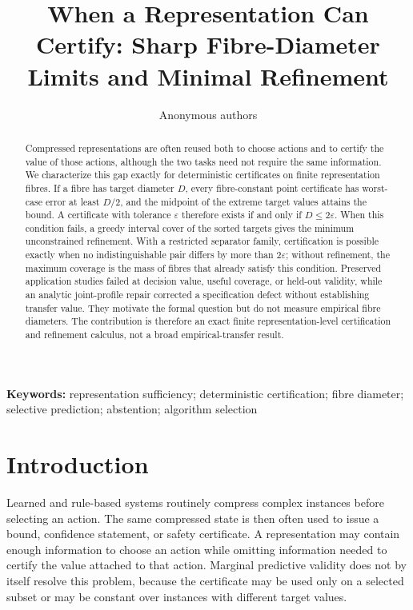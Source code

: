\documentclass[10pt]{article}
\title{When a Representation Can Certify: Sharp Fibre-Diameter Limits and Minimal Refinement}
\author{Anonymous authors}
\newcommand{\1}{\mathbf{1}}
\begin{document}
\raggedbottom
\maketitle

\begin{abstract}
Compressed representations are often reused both to choose actions and to certify the value of those actions, although the two tasks need not require the same information. We characterize this gap exactly for deterministic certificates on finite representation fibres. If a fibre has target diameter $D$, every fibre-constant point certificate has worst-case error at least $D/2$, and the midpoint of the extreme target values attains the bound. A certificate with tolerance $\varepsilon$ therefore exists if and only if $D\leq 2\varepsilon$. When this condition fails, a greedy interval cover of the sorted targets gives the minimum unconstrained refinement. With a restricted separator family, certification is possible exactly when no indistinguishable pair differs by more than $2\varepsilon$; without refinement, the maximum coverage is the mass of fibres that already satisfy this condition. Preserved application studies failed at decision value, useful coverage, or held-out validity, while an analytic joint-profile repair corrected a specification defect without establishing transfer value. They motivate the formal question but do not measure empirical fibre diameters. The contribution is therefore an exact finite representation-level certification and refinement calculus, not a broad empirical-transfer result.
\end{abstract}

\noindent\textbf{Keywords:} representation sufficiency; deterministic certification; fibre diameter; selective prediction; abstention; algorithm selection

\section{Introduction}
Learned and rule-based systems routinely compress complex instances before selecting an action. The same compressed state is then often used to issue a bound, confidence statement, or safety certificate. A representation may contain enough information to choose an action while omitting information needed to certify the value attached to that action. Marginal predictive validity does not by itself resolve this problem, because the certificate may be used only on a selected subset or may be constant over instances with different target values.
\end{document}

